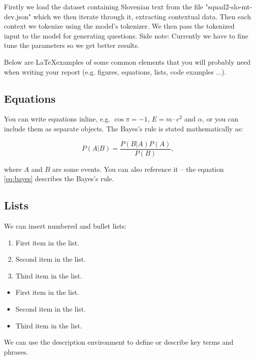 \documentclass[fleqn,moreauthors,10pt]{ds_report}
\begin{document}
Firstly we load the dataset containing Slovenian text from the file "squad2-slo-mt-dev.json" which we then iterate through it, extracting contextual data. Then each context we tokenize using the model's tokenizer. We then pass the tokenized input to the model for generating questions. Side note: Currently we have to fine tune the parameters so we get better results.



Below are \LaTeX examples of some common elements that you will probably need when writing your report (e.g. figures, equations, lists, code examples ...).


\subsection*{Equations}

You can write equations inline, e.g. $\cos\pi=-1$, $E = m \cdot c^2$ and $\alpha$, or you can include them as separate objects. The Bayes’s rule is stated mathematically as:

\begin{equation}
	P(A|B) = \frac{P(B|A)P(A)}{P(B)},
	\label{eq:bayes}
\end{equation}

where $A$ and $B$ are some events. You can also reference it -- the equation \ref{eq:bayes} describes the Bayes's rule.

\subsection*{Lists}

We can insert numbered and bullet lists:

\begin{enumerate}[noitemsep] 
	\item First item in the list.
	\item Second item in the list.
	\item Third item in the list.
\end{enumerate}

\begin{itemize}[noitemsep] 
	\item First item in the list.
	\item Second item in the list.
	\item Third item in the list.
\end{itemize}

We can use the description environment to define or describe key terms and phrases.
\end{document}
